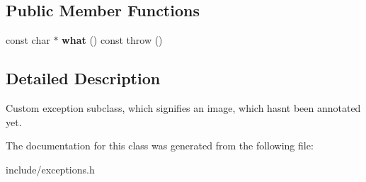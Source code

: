 \subsection*{Public Member Functions}
\begin{DoxyCompactItemize}
\item 
\mbox{\label{classImageNotAnnotatedYet_a092756a54b3f53ff6026bfc150e6fc8c}} 
const char $\ast$ {\bfseries what} () const  throw ()
\end{DoxyCompactItemize}


\subsection{Detailed Description}
Custom exception subclass, which signifies an image, which hasn\textquotesingle{}t been annotated yet. 

The documentation for this class was generated from the following file\+:\begin{DoxyCompactItemize}
\item 
include/exceptions.\+h\end{DoxyCompactItemize}
